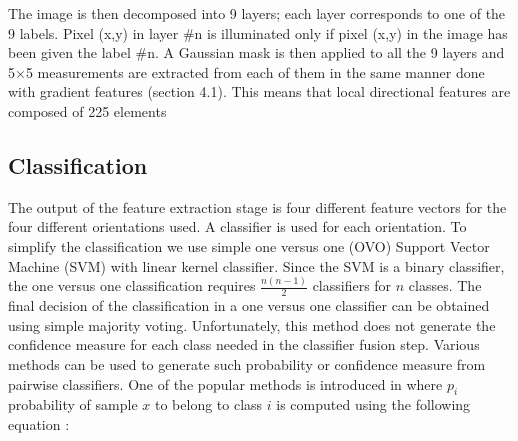\documentclass[conference]{IEEEtran}
\begin{document}
The image is then decomposed into 9 layers; each layer corresponds to one of the 9 labels. Pixel (x,y) in layer #n is illuminated only if pixel (x,y) in the image has been given the label #n. A Gaussian mask is then applied to all the 9 layers and 5×5 measurements are extracted from each of them in the same manner done with gradient features (section 4.1). This means that local directional features are composed of 225 elements




\subsection {Classification}

The output of the feature extraction stage is four different feature vectors for the four different orientations used. A classifier is used for each orientation. To simplify the classification we use simple one versus one (OVO) Support Vector Machine (SVM) with linear kernel classifier. Since the SVM is a binary classifier, the one versus one classification requires $\frac{n(n-1)}{2}$ classifiers for $n$ classes. The final decision of the classification in a one versus one classifier can be obtained using simple majority voting. Unfortunately, this method does not generate the confidence measure for each class needed in the classifier fusion step. Various methods can be used to generate such probability or confidence measure from pairwise classifiers. One of the popular methods is introduced in \cite{pairwise22} where $p_i$ probability of sample $x$ to belong to class $i$  is computed using the following equation :
\end{document}
